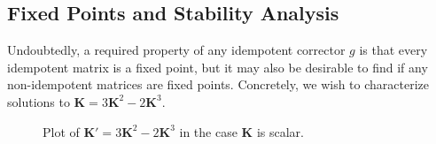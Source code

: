 \documentclass{article}
\newcommand{\vK}{\mathbf{K}}
\begin{document}
\subsection{Fixed Points and Stability Analysis}
Undoubtedly, a required property of any idempotent corrector $g$ is that every idempotent matrix is a fixed point, but it may also be desirable to find if any non-idempotent matrices are fixed points. Concretely, we wish to characterize solutions to $\vK = 3 \vK^2 - 2 \vK^3$.

\begin{figure}
  \centering
  \caption{Plot of $\vK' = 3 \vK^2 - 2 \vK^3$ in the case $\vK$ is scalar.}
  \label{fig:plot-g}
\end{figure}
\end{document}
